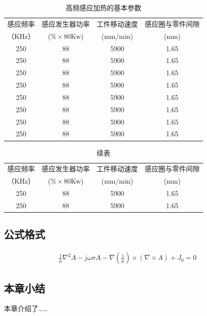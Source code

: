 \documentclass[UTF8,a4paper,12pt]{ctexart}
\numberwithin{equation}{section}
\begin{document}
\begin{table}[!htbp]
\centering
\caption{高频感应加热的基本参数}
\begin{tabular}{|c| c|c|c|}
\hline
感应频率 &感应发生器功率 & 工件移动速度  &感应圈与零件间隙\\
（KHz）&($\% \times$80Kw) &(mm/min)  &(mm)\\
\hline
250 &88 &5900 &1.65\\
\hline
250 &88 &5900 &1.65\\
\hline
250 &88 &5900 &1.65\\
\hline
250 &88 &5900 &1.65\\
\hline
250 &88 &5900 &1.65\\
\hline
250 &88 &5900 &1.65\\
\hline
250 &88 &5900 &1.65\\
\hline
250 &88 &5900 &1.65\\
\hline
\end{tabular}
\end{table}

\begin{table}
\centering
\captionsetup{singlelinecheck=off}
\caption*{续表} %
\begin{tabular}{|c| c|c|c|}
\hline
感应频率 &感应发生器功率 & 工件移动速度  &感应圈与零件间隙\\
（KHz）&($\% \times$80Kw) &(mm/min)  &(mm)\\
\hline
250 &88 &5900 &1.65\\
\hline
250 &88 &5900 &1.65\\
\hline
\end{tabular}
\end{table}


\subsection{公式格式}

\vspace{-10mm}
\begin{eqnarray}
\frac{1}{\mu} \nabla^2A - j \omega \sigma A -\nabla(\frac{1}{\mu}) \times(\nabla \times A)+J_0=0
\end{eqnarray}

\subsection{本章小结}
本章介绍了……

\newpage
\end{document}
